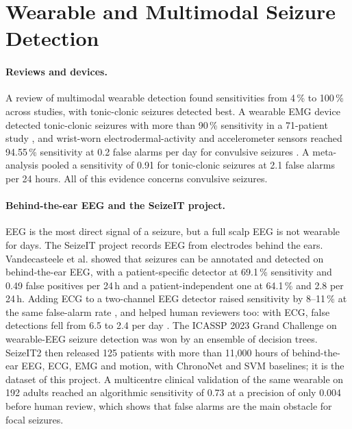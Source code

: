 \section{Wearable and Multimodal Seizure Detection}\label{sec:lit-wearable}

\paragraph{Reviews and devices.} A review of multimodal wearable detection \cite{leijten2018review} found
sensitivities from 4\,\% to 100\,\% across studies, with tonic-clonic seizures detected best. A wearable EMG device
detected tonic-clonic seizures with more than 90\,\% sensitivity in a 71-patient study \cite{beniczky2018emg}, and
wrist-worn electrodermal-activity and accelerometer sensors reached 94.55\,\% sensitivity at 0.2 false alarms per day
for convulsive seizures \cite{onorati2017empatica}. A meta-analysis \cite{naganur2022meta} pooled a sensitivity of 0.91
for tonic-clonic seizures at 2.1 false alarms per 24 hours. All of this evidence concerns convulsive seizures.

\paragraph{Behind-the-ear EEG and the SeizeIT project.} EEG is the most direct signal of a seizure, but a full scalp
EEG is not wearable for days. The SeizeIT project records EEG from electrodes behind the ears. Vandecasteele et al.
\cite{vandecasteele2020bte} showed that seizures can be annotated and detected on behind-the-ear EEG, with a
patient-specific detector at 69.1\,\% sensitivity and 0.49 false positives per 24\,h and a patient-independent one at
64.1\,\% and 2.8 per 24\,h. Adding ECG to a two-channel EEG detector raised sensitivity by 8--11\,\% at the same
false-alarm rate \cite{vandecasteele2021ecg}, and helped human reviewers too: with ECG, false detections fell from 6.5
to 2.4 per day \cite{bhagubai2023ecg}. The ICASSP 2023 Grand Challenge on wearable-EEG seizure detection
\cite{bhagubai2024challenge} was won by an ensemble of decision trees. SeizeIT2 \cite{bhagubai2025seizeit2} then
released 125 patients with more than 11,000 hours of behind-the-ear EEG, ECG, EMG and motion, with ChronoNet and SVM
baselines; it is the dataset of this project. A multicentre clinical validation of the same wearable on 192 adults
\cite{swinnen2026seizeit2} reached an algorithmic sensitivity of 0.73 at a precision of only 0.004 before human review,
which shows that false alarms are the main obstacle for focal seizures.

